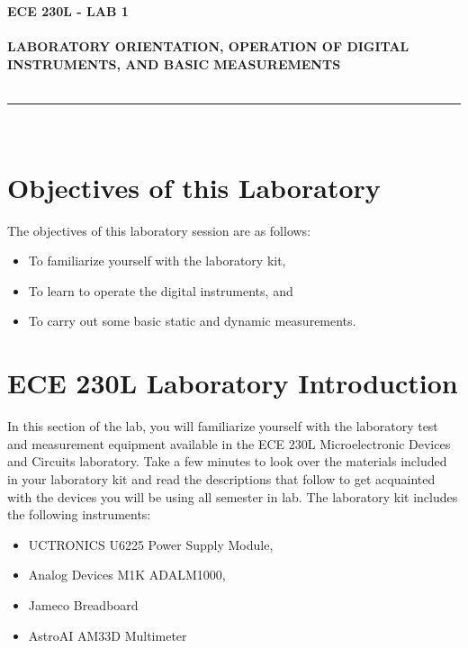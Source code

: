 \documentclass[12pt]{../manual}
\begin{document}
\begin{center}
\textbf{\huge ECE 230L - LAB 1}\\~\\
\textbf{\large LABORATORY ORIENTATION, OPERATION OF DIGITAL INSTRUMENTS, AND BASIC MEASUREMENTS }\\~\\
\rule{6.5in}{0.5mm}\\
\end{center}

\tableofcontents

\listoffigures

\newpage
%
\section{Objectives of this Laboratory}
The objectives of this laboratory session are as follows:
\begin{itemize}
\item To familiarize yourself with the laboratory kit, 
\item To learn to operate the digital instruments, and 
\item To carry out some basic static and dynamic measurements. 
\end{itemize}

\section{ECE 230L Laboratory Introduction}
In this section of the lab, you will familiarize yourself with the laboratory test and measurement equipment available in the ECE 230L Microelectronic Devices and Circuits laboratory.  Take a few minutes to look over the materials included in your laboratory kit and read the descriptions that follow to get acquainted with the devices you will be using all semester in lab. The laboratory kit includes the following instruments:
\begin{itemize}
\item UCTRONICS U6225 Power Supply Module, 
\item Analog Devices M1K ADALM1000,
\item Jameco Breadboard
\item AstroAI AM33D Multimeter
\end{itemize}
\end{document}
